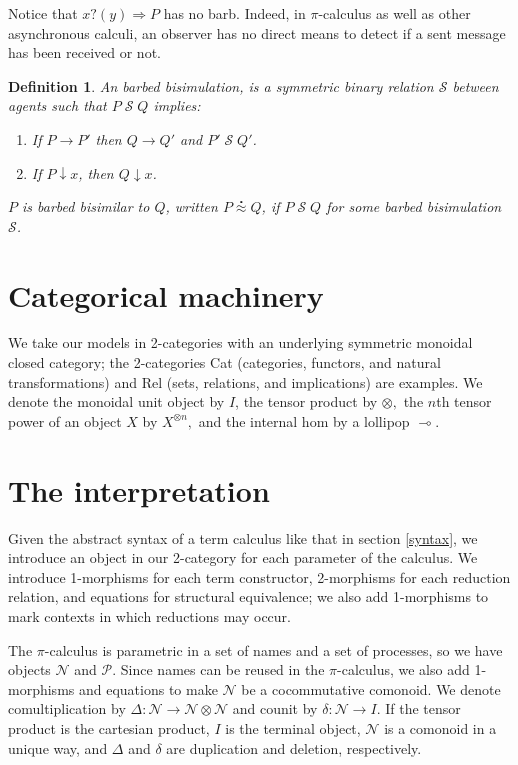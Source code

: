 \documentclass[]{acm_proc_article-sp}
\newcommand{\maps}{\colon}
\newcommand{\concat}{\Rightarrow}
\newcommand{\prefix}[3]{#1 ? ( #2 ) \concat #3}
\renewcommand{\red}{\rightarrow}
\newcommand{\rel}[1]{\;{\mathcal #1}\;} %
\newcommand{\wbbisim}{\stackrel{\centerdot}{\approx}} %
\newtheorem{defn}[thm]{Definition}
\numberwithin{equation}{subsection}
\newcommand{\pic}{$\pi$-calculus}
\begin{document}
Notice that $\prefix{x}{y}{P}$ has no barb.  Indeed, in {\pic} as well
as other asynchronous calculi, an observer has no direct means to
detect if a sent message has been received or not.

\begin{defn}
An \emph{barbed bisimulation}, is a symmetric binary relation 
${\mathcal S}$ between agents such that $P\rel{S}Q$ implies:
\begin{enumerate}
\item If $P \red P'$ then $Q \red Q'$ and $P'\rel{S} Q'$.
\item If $P\downarrow x$, then $Q\downarrow x$.
\end{enumerate}
$P$ is barbed bisimilar to $Q$, written
$P \wbbisim Q$, if $P \rel{S} Q$ for some barbed bisimulation ${\mathcal S}$.
\end{defn}

\section{Categorical machinery}

We take our models in 2-categories with an underlying symmetric monoidal closed category; the 2-categories Cat (categories, functors, and natural transformations) and Rel (sets, relations, and implications) are examples.  We denote the monoidal unit object by $I$, the tensor product by $\otimes,$ the $n$th tensor power of an object $X$ by $X^{\otimes n},$ and the internal hom by a lollipop $\multimap$.

\section{The interpretation}

Given the abstract syntax of a term calculus like that in section \ref{syntax}, we introduce an object in our 2-category for each parameter of the calculus.  We introduce 1-morphisms for each term constructor, 2-morphisms for each reduction relation, and equations for structural equivalence; we also add 1-morphisms to mark contexts in which reductions may occur.

The {\pic} is parametric in a set of names and a set of processes, so we have objects $\mathcal{N}$ and $\mathcal{P}$.  Since names can be reused in the {\pic,} we also add 1-morphisms and equations to make $\mathcal{N}$ be a cocommutative comonoid.  We denote comultiplication by $\Delta\maps \mathcal{N} \to \mathcal{N} \otimes \mathcal{N}$ and counit by $\delta\maps \mathcal{N} \to I.$  If the tensor product is the cartesian product, $I$ is the terminal object, $\mathcal{N}$ is a comonoid in a unique way, and $\Delta$ and $\delta$ are duplication and deletion, respectively.
\end{document}

